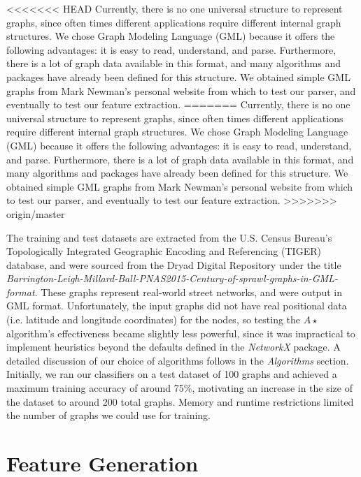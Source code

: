 \documentclass{article}
\begin{document}
<<<<<<< HEAD
Currently, there is no one universal structure to represent graphs, since often times different applications require different internal graph structures. We chose Graph Modeling Language (GML) because it offers the following advantages: it is easy to read, understand, and parse\cite{Himsolt}. Furthermore, there is a lot of graph data available in this format, and many algorithms and packages have already been defined for this structure. We obtained simple GML graphs from Mark Newman's personal website from which to test our parser, and eventually to test our feature extraction\cite{Newman13}.
=======
Currently, there is no one universal structure to represent graphs, since often times different applications require different internal graph structures. We chose Graph Modeling Language (GML) because it offers the following advantages: it is easy to read, understand, and parse. Furthermore, there is a lot of graph data available in this format, and many algorithms and packages have already been defined for this structure. We obtained simple GML graphs from Mark Newman's personal website from which to test our parser, and eventually to test our feature extraction.
>>>>>>> origin/master

The training and test datasets are extracted from the U.S. Census Bureau's Topologically Integrated Geographic Encoding and Referencing (TIGER) database, and were sourced from the Dryad Digital Repository under the title \textit{Barrington-Leigh-Millard-Ball-PNAS2015-Century-of-sprawl-graphs-in-GML-format}. These graphs represent real-world street networks, and were output in GML format. Unfortunately, the input graphs did not have real positional data (i.e. latitude and longitude coordinates) for the nodes, so testing the $A\star$ algorithm's effectiveness became slightly less powerful, since it was impractical to implement heuristics beyond the defaults defined in the \textit{NetworkX} package. A detailed discussion of our choice of algorithms follows in the \textit{Algorithms} section. Initially, we ran our classifiers on a test dataset of 100 graphs and achieved a maximum training accuracy of around 75$\%$, motivating an increase in the size of the dataset to around 200 total graphs. Memory and runtime restrictions limited the number of graphs we could use for training.

\section{Feature Generation}
\end{document}
